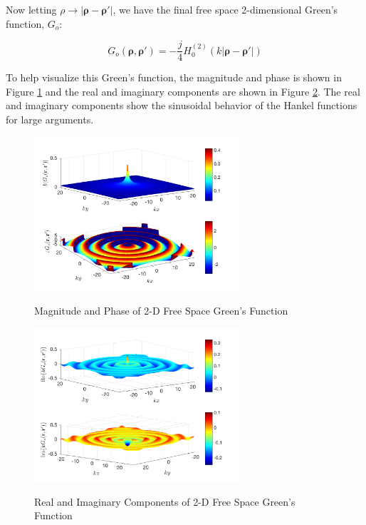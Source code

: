 Now letting $\rho \rightarrow |\boldsymbol{\rho}-\boldsymbol{\rho}'|$, we have the final free space 2-dimensional Green's function, $G_o$:

\begin{equation}
\boxed{G_o\left(\boldsymbol{\rho},\boldsymbol{\rho}'\right) = -\frac{j}{4}H_0^{(2)}\left(k|\boldsymbol{\rho} - \boldsymbol{\rho}' | \right)}
\label{gf_eq:40}
\end{equation}
\renewcommand{\baselinestretch}{2} \small\normalsize

To help visualize this Green's function, the magnitude and phase is shown in Figure \ref{gf_fig:3} and the real and imaginary components are shown in Figure \ref{gf_fig:4}. The real and imaginary components show the sinusoidal behavior of the Hankel functions for large arguments.

\begin{figure}[H]
\begin{center}
\includegraphics[width=3in]{../media/2d_fs_gf_mag.png}
\end{center}
\renewcommand{\baselinestretch}{1}
\small\normalsize
\begin{quote}
\caption[Magnitude and Phase of 2-D Free Space Green's Function]{Magnitude and Phase of 2-D Free Space Green's Function \label{gf_fig:3}}
\end{quote}
\end{figure} 
\renewcommand{\baselinestretch}{2}
\small\normalsize

\begin{figure}[H]
\begin{center}
\includegraphics[width=3in]{../media/2d_fs_gf_re_im.png}
\end{center}
\renewcommand{\baselinestretch}{1}
\small\normalsize
\begin{quote}
\caption[Real and Imaginary Components of 2-D Free Space Green's Function]{Real and Imaginary Components of 2-D Free Space Green's Function \label{gf_fig:4}}
\end{quote}
\end{figure} 
\renewcommand{\baselinestretch}{2}
\small\normalsize


